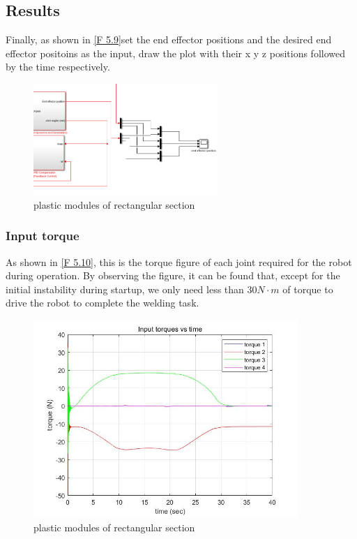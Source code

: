 \subsection{Results}

Finally, as shown in \autoref{F 5.9}set the end effector positions and the desired end effector positoins as the input, draw the plot with their x y z positions followed by the time respectively.

\begin{figure}[htbp]
	\centering
	\includegraphics[width=7cm]{./fig/re.png}
	\caption{plastic modules of rectangular section}
	\label{F 5.9}
\end{figure}


\subsubsection*{Input torque}


As shown in \autoref{F 5.10}, this is the torque figure of each joint required for the robot during operation. By observing the figure, it can be found that, except for the initial instability during startup, we only need less than $30N\cdot m$ of torque to drive the robot to complete the welding task.

\begin{figure}[htbp]
	\centering
	\includegraphics[width=10cm]{./fig/3.jpg}
	\caption{plastic modules of rectangular section}
	\label{F 5.10}
\end{figure}

